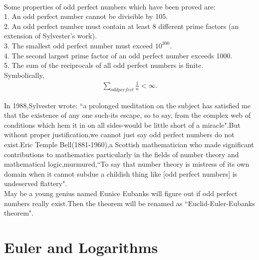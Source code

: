 \documentclass[a4paper,reqno,11pt]{book}
\theoremstyle{plain}%
\theoremstyle{definition}
\begin{document}
\\
Some properties of odd perfect numbers which have been proved are:\\
1. An odd perfect number cannot be divisible by 105.\\
2. An odd perfect number must contain at least 8 different prime factors (an extension of Sylvester's work).\\
3. The smallest odd perfect number must exceed $10^{300}$.\\
4. The second largest prime factor of an odd perfect number exceeds 1000.\\
5. The sum of the reciprocals of all odd perfect numbers is finite.\cite{ref1}\\
Symbolically,
\begin{eqnarray*}
    \sum_{odd perfect}\frac{1}{n}<\infty.
\end{eqnarray*}

In 1988,Sylvester wrote: ``a prolonged meditation on the subject has satisfied me that the existence of any one such-its escape, so to say, from the complex web of conditions which hem it in on all sides-would 
be little short of a miracle".But without proper justification,we cannot just say odd perfect numbers do not exist.Eric Temple Bell(1881-1960),a Scottish mathematician who made significant contributions to mathematics particularly in the fields of number theory and mathematical logic,murmured,``To say that number theory is mistress of its own domain when it cannot subdue a childish thing like [odd perfect numbers] is undeserved flattery".\\
May be a young genius named Eunice Eubanks will figure out if odd perfect numbers really exist.Then the theorem will be renamed as ``Euclid-Euler-Eubanks theorem".
\chapter{Euler and Logarithms}
\end{document}
